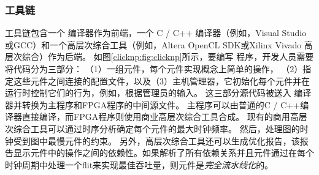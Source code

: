 \subsubsection{\name 工具链}
\label{clicknp:subsec:toolchain}
\name 工具链包含一个 \name 编译器作为前端，一个 C / C++ 编译器（例如，Visual Studio或GCC）和一个高层次综合工具（例如，Altera OpenCL SDK或Xilinx Vivado 高层次综合）作为后端。
如图\ref{clicknp:fig:clicknp}所示，要编写 \name 程序，开发人员需要将代码分为三部分：
（1）一组元件，每个元件实现概念上简单的操作，
（2）指定这些元件之间连接的配置文件，以及（3）主机管理器，它初始化每个元件并在运行时控制它们的行为，例如，根据管理员的输入。
这三部分源代码被送入 \name 编译器并转换为主程序和FPGA程序的中间源文件。
主程序可以由普通的C / C++编译器直接编译，而FPGA程序则使用商业高层次综合工具合成。
现有的商用高层次综合工具可以通过时序分析确定每个元件的最大时钟频率。
然后，\name 处理图的时钟受到图中最慢元件的约束。
另外，高层次综合工具还可以生成优化报告，该报告显示元件中的操作之间的依赖性。如果解析了所有依赖关系并且元件通过在每个时钟周期中处理一个flit来实现最佳吞吐量，则元件是\textit {完全流水线化}的。
